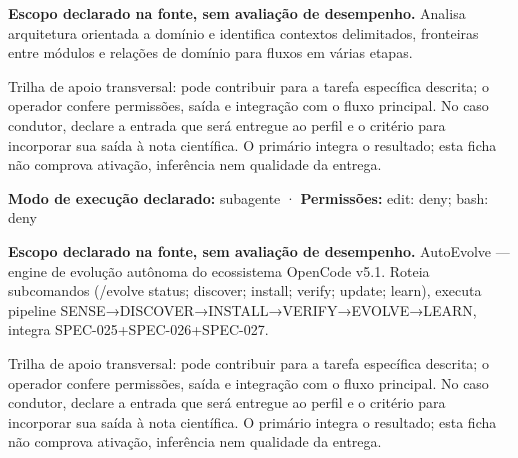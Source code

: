 
\begin{descricao}
\textbf{Escopo declarado na fonte, sem avaliação de desempenho.}
Analisa arquitetura orientada a domínio e identifica contextos delimitados, fronteiras entre módulos e relações de domínio para fluxos em várias etapas.
\end{descricao}

\begin{funcao}
Trilha de apoio transversal: pode contribuir para a tarefa específica descrita; o operador confere permissões, saída e integração com o fluxo principal. No caso condutor, declare a entrada que será entregue ao perfil e o critério para incorporar sua saída à nota científica. O primário integra o resultado; esta ficha não comprova ativação, inferência nem qualidade da entrega.
\end{funcao}

\begin{arquitetura}
\textbf{Modo de execução declarado:} subagente · \textbf{Permissões:} edit: deny; bash: deny
\end{arquitetura}


\begin{descricao}
\textbf{Escopo declarado na fonte, sem avaliação de desempenho.}
AutoEvolve — engine de evolução autônoma do ecossistema OpenCode v5.1. Roteia subcomandos (/evolve status; discover; install; verify; update; learn), executa pipeline SENSE→DISCOVER→INSTALL→VERIFY→EVOLVE→LEARN, integra SPEC-025+SPEC-026+SPEC-027.
\end{descricao}

\begin{funcao}
Trilha de apoio transversal: pode contribuir para a tarefa específica descrita; o operador confere permissões, saída e integração com o fluxo principal. No caso condutor, declare a entrada que será entregue ao perfil e o critério para incorporar sua saída à nota científica. O primário integra o resultado; esta ficha não comprova ativação, inferência nem qualidade da entrega.
\end{funcao}

